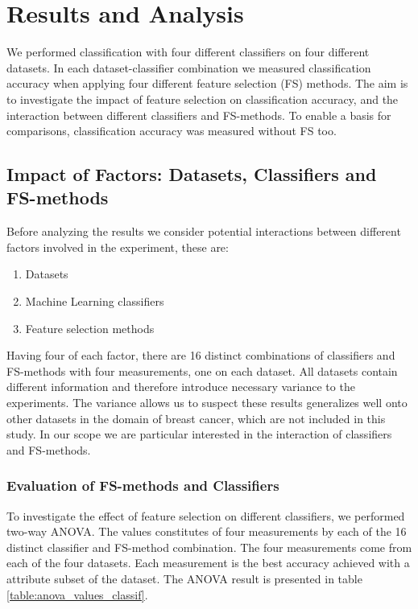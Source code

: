 \chapter{Results and Analysis}

We performed classification with four different classifiers on four different datasets. In each dataset-classifier combination we measured classification accuracy when applying four different feature selection (FS) methods. The aim is to investigate the impact of feature selection on classification accuracy, and the interaction between different classifiers and FS-methods. To enable a basis for comparisons, classification accuracy was measured without FS too.

\section{Impact of Factors: Datasets, Classifiers and FS-methods}
\label{Variation_among_factors}

Before analyzing the results we consider potential interactions between different factors involved in the experiment, these are:

\begin{enumerate}
  \item Datasets
  \item Machine Learning classifiers
  \item Feature selection methods
\end{enumerate}

Having four of each factor, there are 16 distinct combinations of classifiers and FS-methods with four measurements, one on each dataset. All datasets contain different information and therefore introduce necessary variance to the experiments. The variance allows us to suspect these results generalizes well onto other datasets in the domain of breast cancer, which are not included in this study. In our scope we are particular interested in the interaction of classifiers and FS-methods.

% 

\subsection{Evaluation of FS-methods and Classifiers}
\label{sec:fs_methods_classifiers}

To investigate the effect of feature selection on different classifiers, we performed two-way ANOVA. The values constitutes of four measurements by each of the 16 distinct classifier and FS-method combination. The four measurements come from each of the four datasets. Each measurement is the best accuracy achieved with a attribute subset of the dataset. The ANOVA result is presented in table \ref{table:anova_values_classif}.

